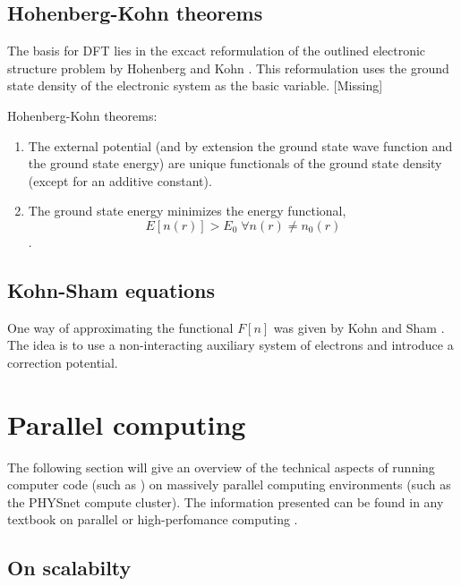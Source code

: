 \documentclass[main.tex]{subfiles}
\begin{document}

\subsection{Hohenberg-Kohn theorems}

The basis for DFT lies in the excact reformulation of the outlined electronic structure problem by Hohenberg and Kohn \cite{hohenberg_inhomogeneous_1964}.
This reformulation uses the ground state density of the electronic system as the basic variable.
[Missing]

Hohenberg-Kohn theorems:

\begin{enumerate}[I]
    \item The external potential (and by extension the ground state wave function and the ground state energy) are  unique functionals of the ground state density (except for an additive constant).
    \item The ground state energy minimizes the energy functional,
    \[E[n(r)] > E_0 \;\forall n(r) \neq n_0 (r)\].
\end{enumerate}

\subsection{Kohn-Sham equations}

One way of approximating the functional \(F[n]\) was given by Kohn and Sham \cite{kohn_self-consistent_1965}. The idea is to use a non-interacting
auxiliary system of electrons and introduce a correction potential. 

\section{Parallel computing\label{sec:parallel_computing}}

The following section will give an overview of the technical aspects of running computer code (such as \QE) on massively parallel computing environments (such as the PHYSnet compute cluster).
The information presented can be found in any textbook on parallel or high-perfomance computing \cite{hager_introduction_2010}.

\subsection{On scalabilty}
\end{document}
